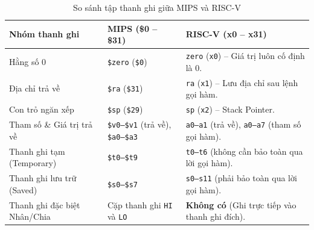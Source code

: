 \documentclass[12pt,a4paper]{article}
\begin{document}
\begin{table}[H]
    \centering
    \small
    \begin{tabularx}{\textwidth}{llX}
        \toprule
        \textbf{Nhóm thanh ghi} & \textbf{MIPS (\$0 -- \$31)} & \textbf{RISC-V (x0 -- x31)} \\
        \midrule
        Hằng số 0 & \texttt{\$zero} (\texttt{\$0}) & \texttt{zero} (\texttt{x0}) -- Giá trị luôn cố định là 0. \\
        Địa chỉ trả về & \texttt{\$ra} (\texttt{\$31}) & \texttt{ra} (\texttt{x1}) -- Lưu địa chỉ sau lệnh gọi hàm. \\
        Con trỏ ngăn xếp & \texttt{\$sp} (\texttt{\$29}) & \texttt{sp} (\texttt{x2}) -- Stack Pointer. \\
        Tham số \& Giá trị trả về & \texttt{\$v0--\$v1} (trả về), \texttt{\$a0--\$a3} & \texttt{a0--a1} (trả về), \texttt{a0--a7} (tham số gọi hàm). \\
        Thanh ghi tạm (Temporary) & \texttt{\$t0--\$t9} & \texttt{t0--t6} (không cần bảo toàn qua lời gọi hàm). \\
        Thanh ghi lưu trữ (Saved) & \texttt{\$s0--\$s7} & \texttt{s0--s11} (phải bảo toàn qua lời gọi hàm). \\
        Thanh ghi đặc biệt Nhân/Chia & Cặp thanh ghi \texttt{HI} và \texttt{LO} & \textbf{Không có} (Ghi trực tiếp vào thanh ghi đích). \\
        \bottomrule
    \end{tabularx}
    \caption{So sánh tập thanh ghi giữa MIPS và RISC-V}
    \label{tab:registers}
\end{table}
\end{document}
